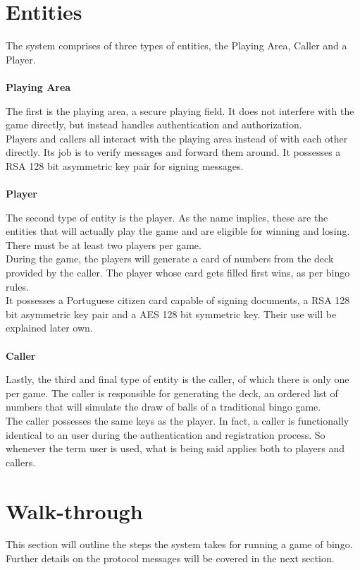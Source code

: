 \documentclass[11pt]{article}
\begin{document}
\section{Entities}
The system comprises of three types of entities, the Playing Area, Caller and a Player.
\\ \\ {\Large \textbf{Playing Area}} \par
The first is the playing area, a secure playing field. It does not interfere with the game directly, but instead handles authentication and authorization. \\
Players and callers all interact with the playing area instead of with each other directly. Its job is to verify messages and forward them around.
It possesses a RSA 128 bit asymmetric key pair for signing messages.
\\ \\ {\Large \textbf{Player}} \par
The second type of entity is the player. As the name implies, these are the entities that will actually play the game and are eligible for winning and losing. There must be at least two players per game. \\
During the game, the players will generate a card of numbers from the deck provided by the caller. The player whose card gets filled first wins, as per bingo rules. \\ It possesses a Portuguese citizen card capable of signing documents, a RSA 128 bit asymmetric key pair and a AES 128 bit symmetric key. Their use will be explained later own.
\\ \\ {\Large \textbf{Caller}} \par
Lastly, the third and final type of entity is the caller, of which there is only one per game. The caller is responsible for generating the deck, an ordered list of numbers that will simulate the draw of balls of a traditional bingo game.
\\The caller possesses the same keys as the player. In fact, a caller is functionally identical to an user during the authentication and registration process. So whenever the term user is used, what is being said applies both to players and callers.


\section{Walk-through}
This section will outline the steps the system takes for running a game of bingo. Further details on the protocol messages will be covered in the next section. 
\end{document}
